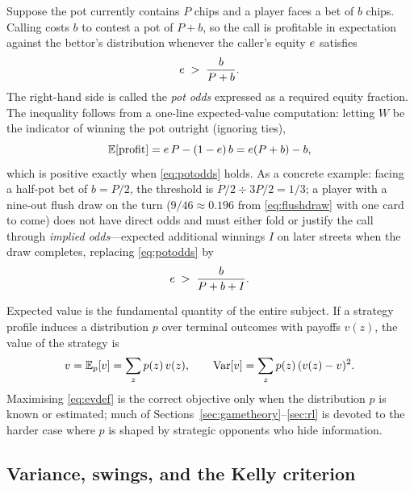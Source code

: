 Suppose the pot currently contains $P$ chips and a player faces a bet of $b$ chips. Calling costs $b$ to contest a pot of $P + b$, so the call is profitable in expectation against the bettor's distribution whenever the caller's equity $e$ satisfies
\begin{equation}\label{eq:potodds}
e \;>\; \frac{b}{P + b} .
\end{equation}
The right-hand side is called the \emph{pot odds} expressed as a required equity fraction. The inequality follows from a one-line expected-value computation: letting $W$ be the indicator of winning the pot outright (ignoring ties),
\begin{equation}\label{eq:evcall}
\operatorname{\mathbb{E}}[\text{profit}] = e\,P - (1-e)\,b = e (P + b) - b ,
\end{equation}
which is positive exactly when \eqref{eq:potodds} holds. As a concrete example: facing a half-pot bet of $b = P/2$, the threshold is $P/2 \div 3P/2 = 1/3$; a player with a nine-out flush draw on the turn ($9/46 \approx 0.196$ from \eqref{eq:flushdraw} with one card to come) does not have direct odds and must either fold or justify the call through \emph{implied odds}---expected additional winnings $I$ on later streets when the draw completes, replacing \eqref{eq:potodds} by
\begin{equation}
e \;>\; \frac{b}{P + b + I} .
\end{equation}

Expected value is the fundamental quantity of the entire subject. If a strategy profile induces a distribution $p$ over terminal outcomes with payoffs $v(z)$, the value of the strategy is
\begin{equation}\label{eq:evdef}
v = \operatorname{\mathbb{E}}_p[v] = \sum_z p(z)\, v(z),
\qquad \operatorname{\mathrm{Var}}[v] = \sum_z p(z)\,(v(z) - v)^2 .
\end{equation}
Maximising \eqref{eq:evdef} is the correct objective only when the distribution $p$ is known or estimated; much of Sections~\ref{sec:gametheory}--\ref{sec:rl} is devoted to the harder case where $p$ is shaped by strategic opponents who hide information.

\subsection{Variance, swings, and the Kelly criterion}


